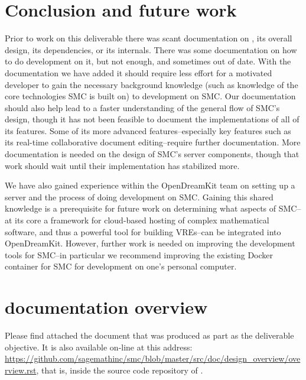 \documentclass{deliverablereport}
\begin{document}
\section{Conclusion and future work}
Prior to work on this deliverable there was scant documentation on \SMC, its
overall design, its dependencies, or its internals.  There was some
documentation on how to do development on it, but not enough, and sometimes
out of date.  With the documentation we have added it should require less
effort for a motivated developer to gain the necessary background knowledge
(such as knowledge of the core technologies SMC is built on) to development on
SMC.  Our documentation should also help lead to a faster understanding of
the general flow of SMC's design, though it has not been feasible to document
the implementations of all of its features.  Some of its more advanced
features--especially key features such as its real-time collaborative document
editing--require further documentation.  More documentation is needed on the
design of SMC's server components, though that work should wait until their
implementation has stabilized more.

We have also gained experience within the OpenDreamKit team on setting up a
\SMC server and the process of doing development on SMC.  Gaining this shared
knowledge is a prerequisite for future work on determining what aspects of
SMC--at its core a framework for cloud-based hosting of complex mathematical
software, and thus a powerful tool for building VREs--can be integrated into
OpenDreamKit.  However, further work is needed on improving the development
tools for SMC--in particular we recommend improving the existing Docker
container for SMC for development on one's personal computer.


\printbibliography

\appendix
\section{\SMC documentation overview}
\label{app:doc}

Please find attached the document that was produced as part as the deliverable
objective.  It is also available on-line at this address:
\url{https://github.com/sagemathinc/smc/blob/master/src/doc/design_overview/overview.rst},
that is, inside the source code repository of \SMC.


\end{document}
